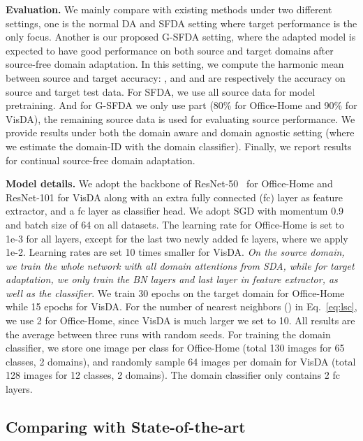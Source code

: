 \documentclass[10pt,twocolumn,letterpaper]{article}
\begin{document}
\noindent \textbf{Evaluation.} We mainly compare with existing methods under two different settings, one is the normal DA and SFDA setting where target performance is the only focus. Another is our proposed G-SFDA setting, where the adapted model is expected to have good performance on both source and target domains after source-free domain adaptation. In this setting, we compute the harmonic mean between source and target accuracy: , and  and  are respectively the accuracy on source and target test data. For SFDA, we use all source data for model pretraining. And for G-SFDA we only use part (80\% for Office-Home and 90\% for VisDA), the remaining source data is used for evaluating source performance. We provide results under both the domain aware and domain agnostic setting (where we estimate the domain-ID with the domain classifier). Finally, we report results for continual source-free domain adaptation.



\noindent \textbf{Model details.} We adopt the backbone of ResNet-50~\cite{he2016deep} for Office-Home and  ResNet-101 for VisDA along with an extra fully connected (fc) layer as feature extractor, and a fc layer as classifier head. We adopt SGD with momentum 0.9 and batch size of 64 on all datasets. The learning rate for Office-Home is set to 1e-3 for all layers, except for the last two newly added fc layers, where we apply 1e-2. Learning rates are set 10 times smaller for VisDA. \textit{On the source domain, we train the whole network with all domain attentions from SDA, while for target adaptation, we only train the BN layers and last layer in feature extractor, as well as the classifier}. We train 30 epochs on the target domain for Office-Home while 15 epochs for VisDA. For the number of nearest neighbors () in Eq.~\ref{eq:lsc}, we use 2 for Office-Home, since VisDA is much larger we set  to 10. All results are the average between three runs with random seeds. For training the domain classifier, we store one image per class for Office-Home (total 130 images for 65 classes, 2 domains), and randomly sample 64 images per domain for VisDA (total 128 images for 12 classes, 2 domains). The domain classifier only contains 2 fc layers. 

\subsection{Comparing with State-of-the-art}
\end{document}

